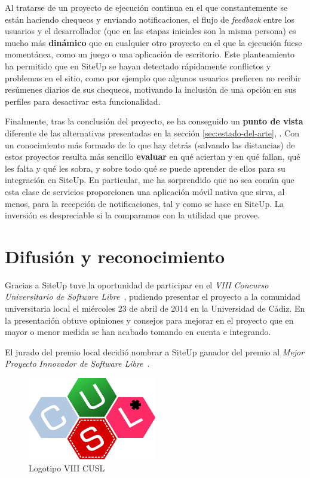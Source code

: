Al tratarse de un proyecto de ejecución continua en el que constantemente se
están haciendo chequeos y enviando notificaciones, el flujo de \textit{feedback}
entre los usuarios y el desarrollador (que en las etapas iniciales son la misma
persona) es mucho más \textbf{dinámico} que en cualquier otro proyecto en el que
la ejecución fuese momentánea, como un juego o una aplicación de
escritorio. Este planteamiento ha permitido que en SiteUp se hayan detectado
rápidamente conflictos y problemas en el sitio, como por ejemplo que algunos
usuarios prefieren no recibir resúmenes diarios de sus chequeos, motivando la
inclusión de una opción en sus perfiles para desactivar esta funcionalidad.

Finalmente, tras la conclusión del proyecto, se ha conseguido un \textbf{punto
  de vista} diferente de las alternativas presentadas en la sección
\ref{sec:estado-del-arte}, \textit{}. Con un
conocimiento más formado de lo que hay detrás (salvando las distancias) de estos
proyectos resulta más sencillo \textbf{evaluar} en qué aciertan y en qué fallan,
qué les falta y qué les sobra, y sobre todo qué se puede aprender de ellos para
su integración en SiteUp. En particular, me ha sorprendido que no sea común que
esta clase de servicios proporcionen una aplicación móvil nativa que sirva, al
menos, para la recepción de notificaciones, tal y como se hace en SiteUp. La
inversión es despreciable si la comparamos con la utilidad que provee.

\section{Difusión y reconocimiento}

Gracias a SiteUp tuve la oportunidad de participar en el \textit{VIII Concurso
  Universitario de Software Libre}~\cite{cusl}, pudiendo presentar el proyecto a
la comunidad universitaria local el miércoles 23 de abril de 2014 en la
Universidad de Cádiz. En la presentación obtuve opiniones y consejos para
mejorar en el proyecto que en mayor o menor medida se han acabado tomando en
cuenta e integrando.

El jurado del premio local decidió nombrar a SiteUp ganador del premio al
\textit{Mejor Proyecto Innovador de Software Libre}~\cite{cusl-local}.

\begin{figure}[H]
  \centering
  \includegraphics[width=0.5\textwidth]{8_conclusiones/logo_cusl}
  \caption{Logotipo VIII CUSL}
\end{figure}




